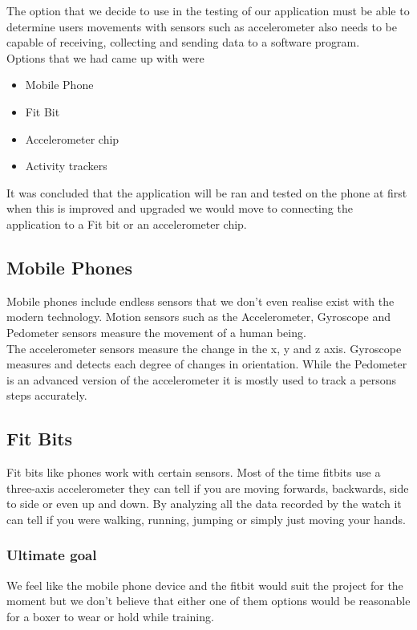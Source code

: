 \documentclass[a4paper,12pt,twoside]{report}
\begin{document}
The option that we decide to use in the testing of our application must be able to determine users movements with sensors such as accelerometer also needs to be capable of receiving, collecting and sending data to a software program.\\

Options that we had came up with were 
\begin{itemize}
    \item Mobile Phone 
    \item Fit Bit
    \item Accelerometer chip
    \item Activity trackers
\end{itemize}

It was concluded that the application will be ran and tested on the phone at first when this is improved and upgraded we would move to connecting the application to a Fit bit or an accelerometer chip.
\newpage

\subsection{Mobile Phones}
Mobile phones include endless sensors that we don't even realise exist with the modern technology.
Motion sensors such as the Accelerometer, Gyroscope and Pedometer sensors measure the movement of a human being. \\

The accelerometer sensors measure the change in the x, y and z axis. Gyroscope measures and detects each degree of changes in orientation. While the Pedometer is an advanced version of the accelerometer it is mostly used to track a persons steps accurately.\cite{sensorsPhone}   

\subsection{Fit Bits}

Fit bits like phones work with certain sensors. Most of the time fitbits use a three-axis accelerometer they can tell if you are moving forwards, backwards, side to side or even up and down.
By analyzing all the data recorded by the watch it can tell if you were walking, running, jumping or simply just moving your hands.\cite{sensorsFitbit}

\subsubsection{Ultimate goal}
We feel like the mobile phone device and the fitbit would suit the project for the moment but we don't believe that either one of them options would be reasonable for a boxer to wear or hold while training.\\
\end{document}
